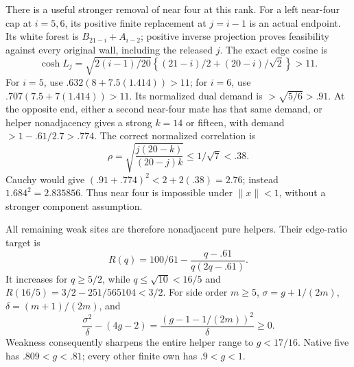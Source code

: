 There is a useful stronger removal of
near four at this rank.
For a left near-four cap at \(i=5,6\),
its positive finite replacement at
\(j=i-1\) is an actual endpoint.
Its white forest is
\(B_{21-i}+A_{i-2}\); positive inverse
projection proves feasibility against
every original wall, including the
released \(j\).
The exact edge cosine is
\[
 \cosh L_j=\sqrt{2(i-1)/20}
                 \left\{(21-i)/2+(20-i)/\sqrt2\right\}>11 .
\]
For \(i=5\), use
\(.632(8+7.5(1.414))>11\);
for \(i=6\), use
\(.707(7.5+7(1.414))>11\).
Its normalized dual demand is
\(>\sqrt{5/6}>.91\).
At the opposite end, either a second
near-four mate has that same demand,
or helper nonadjacency gives a strong
\(k=14\) or fifteen, with demand
\(>1-.61/2.7>.774\).
The correct normalized correlation is
\[
 \rho=\sqrt{\frac{j(20-k)}{(20-j)k}}
                       \le1/\sqrt7<.38 .
\]
Cauchy would give
\((.91+.774)^2<2+2(.38)=2.76\);
instead \(1.684^2=2.835856\).
Thus near four is impossible under
\(\|x\|<1\), without a stronger
component assumption.

All remaining weak sites are therefore
nonadjacent pure helpers.
Their edge-ratio target is
\[
 R(q)=100/61-\frac{q-.61}{q(2q-.61)} .
\]
It increases for \(q\ge5/2\), while
\(q\le\sqrt{10}<16/5\) and
\(R(16/5)=3/2-251/565104<3/2\).
For side order \(m\ge5\),
\(\sigma=g+1/(2m)\), \(\delta=(m+1)/(2m)\),
and
\[
 \frac{\sigma^2}{\delta}-(4g-2)
                   =\frac{(g-1-1/(2m))^2}{\delta}\ge0 .
\]
Weakness consequently sharpens the
entire helper range to \(g<17/16\).
Native five has \(.809<g<.81\);
every other finite own has \(.9<g<1\).

